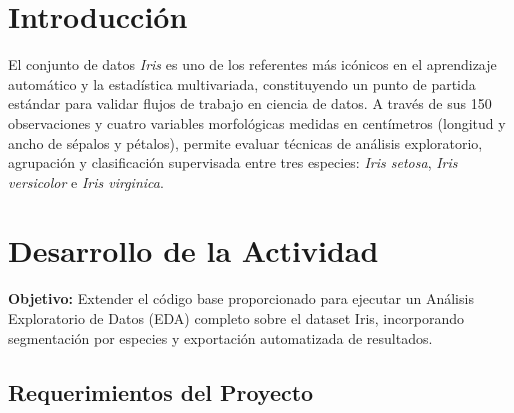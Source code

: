 \documentclass[11pt,letterpaper]{article}
\begin{document}
\portada
\indicegeneral


\section{Introducción}

El conjunto de datos \textit{Iris} \parencite{fisher1936}  es uno de los referentes más icónicos en el aprendizaje automático \parencite{meaa_u1_tema11}  y la estadística multivariada, constituyendo un punto de partida estándar para validar flujos de trabajo en ciencia de datos. A través de sus 150 observaciones y cuatro variables morfológicas medidas en centímetros (longitud y ancho de sépalos y pétalos), permite evaluar técnicas de análisis exploratorio, agrupación y clasificación supervisada entre tres especies: \textit{Iris setosa}, \textit{Iris versicolor} e \textit{Iris virginica}.

\section{Desarrollo de la Actividad}

\textbf{Objetivo:} Extender el código base proporcionado para ejecutar un Análisis Exploratorio de Datos (EDA) completo sobre el dataset Iris, incorporando segmentación por especies y exportación automatizada de resultados.

\subsection*{Requerimientos del Proyecto}
\end{document}
